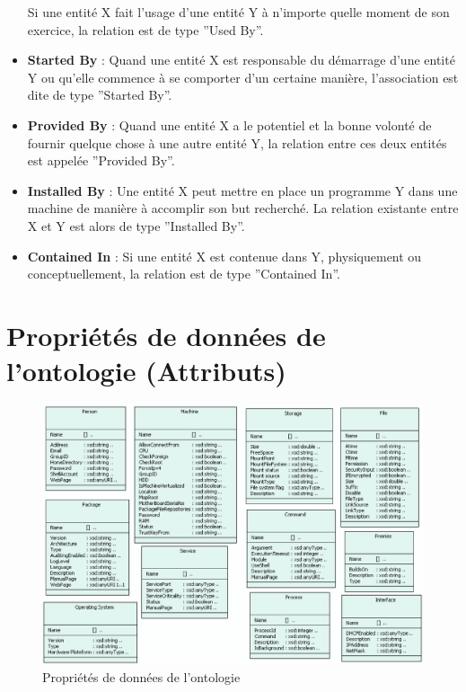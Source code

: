 \begin{itemize}
	  Si une entité X fait l'usage d'une entité Y à n'importe quelle moment
	  de son exercice, la relation est de type ''Used By''.
  \item \textbf{Started By} : 
	  Quand une entité X est responsable du démarrage d'une entité Y ou
	  qu'elle commence à se comporter d'un certaine manière, l'association
	  est dite de type ''Started By''.
  \item \textbf{Provided By} : 
	  Quand une entité X a le potentiel et la bonne volonté de fournir
	  quelque chose à une autre entité Y, la relation entre ces deux entités
	  est appelée ''Provided By''.
  \item \textbf{Installed By} : 
	  Une entité X peut mettre en place un programme Y dans une machine de
	  manière à accomplir son but recherché. La relation existante entre X
	  et Y est alors de type ''Installed By''.
  \item \textbf{Contained In} :
	  Si une entité X est contenue dans Y, physiquement ou conceptuellement,
	  la relation est de type ''Contained In''.
\end{itemize}

\section{Propriétés de données de l'ontologie (Attributs)}

\begin{figure}[H]
    \centering
    \includegraphics[width=.8\textwidth]{img/ontology_attributes}
    \caption{Propriétés de données de l'ontologie}
    \label{fig:ontology_entities}
\end{figure}

